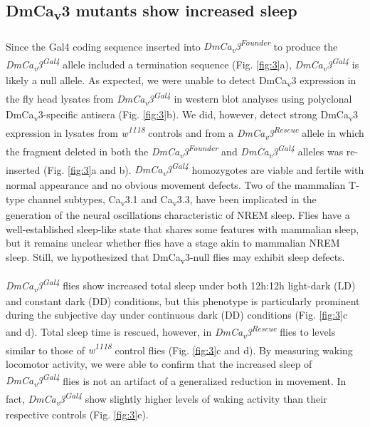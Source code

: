 \subsection*{DmCa\textsubscript{v}3 mutants show increased sleep}

Since the Gal4 coding sequence inserted into \emph{DmCa\textsubscript{v}3\textsuperscript{Founder}} to produce the \emph{DmCa\textsubscript{v}3\textsuperscript{Gal4}} allele included a termination sequence (Fig. \ref{fig:3}a), \emph{DmCa\textsubscript{v}3\textsuperscript{Gal4}} is likely a null allele.
As expected, we were unable to detect DmCa\textsubscript{v}3 expression in the fly head lysates from \emph{DmCa\textsubscript{v}3\textsuperscript{Gal4}} in western blot analyses using polyclonal DmCa\textsubscript{v}3-specific antisera (Fig. \ref{fig:3}b). We did, however, detect strong DmCa\textsubscript{v}3 expression in lysates from \emph{w\textsuperscript{1118}} controls and from a \emph{DmCa\textsubscript{v}3\textsuperscript{Rescue}} allele in which the fragment deleted in both the \emph{DmCa\textsubscript{v}3\textsuperscript{Founder}} and \emph{DmCa\textsubscript{v}3\textsuperscript{Gal4}} alleles was re-inserted (Fig. \ref{fig:3}a and b).
\emph{DmCa\textsubscript{v}3\textsuperscript{Gal4}} homozygotes are viable and fertile with normal appearance and no obvious movement defects.
Two of the mammalian T-type channel subtypes, Ca\textsubscript{v}3.1 and Ca\textsubscript{v}3.3, have been implicated in the generation of the neural oscillations characteristic of NREM sleep.
Flies have a well-established sleep-like state that shares some features with mammalian sleep, but it remains unclear whether flies have a stage akin to mammalian NREM sleep.
Still, we hypothesized that DmCa\textsubscript{v}3-null flies may exhibit sleep defects.

\emph{DmCa\textsubscript{v}3\textsuperscript{Gal4}} flies show increased total sleep under both 12h:12h light-dark (LD) and constant dark (DD) conditions, but this phenotype is particularly prominent during the subjective day under continuous dark (DD) conditions (Fig. \ref{fig:3}c and d).
Total sleep time is rescued, however, in \emph{DmCa\textsubscript{v}3\textsuperscript{Rescue}} flies to levels similar to those of \emph{w\textsuperscript{1118}} control flies (Fig. \ref{fig:3}c and d).
By measuring waking locomotor activity, we were able to confirm that the increased sleep of \emph{DmCa\textsubscript{v}3\textsuperscript{Gal4}} flies is not an artifact of a generalized reduction in movement. In fact, \emph{DmCa\textsubscript{v}3\textsuperscript{Gal4}} show slightly higher levels of waking activity than their respective controls (Fig. \ref{fig:3}e).


